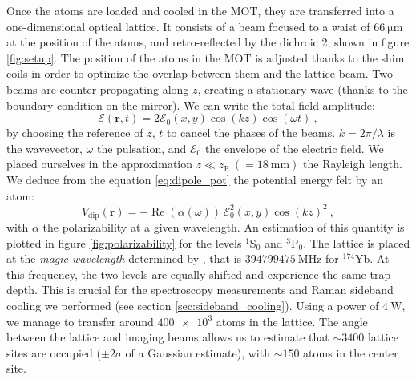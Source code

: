 \documentclass[11pt]{article}
\newcommand{\mathsc}[1]{\mathrm{\scriptscriptstyle {#1}}}
\numberwithin{equation}{section}
\numberwithin{figure}{section}
\begin{document}
Once the atoms are loaded and cooled in the MOT, they are transferred into a one-dimensional optical lattice. It consists of a beam focused to a waist of $\SI{66}{\micro\metre}$ at the position of the atoms, and retro-reflected by the dichroic 2, shown in figure \ref{fig:setup}. The position of the atoms in the MOT is adjusted thanks to the shim coils in order to optimize the overlap between them and the lattice beam. 
Two beams are counter-propagating along $z$, creating a stationary wave (thanks to the boundary condition on the mirror). We can write the total field amplitude:
%
\begin{equation}
	\mathcal{E}(\mathbf{r}, t) = 2 \mathcal{E}_0(x, y) \cos(kz) \cos(\omega t)~,
\end{equation}
%
by choosing the reference of $z$, $t$ to cancel the phases of the beams. $k = 2 \pi / \lambda$ is the wavevector, $\omega$ the pulsation, and $\mathcal{E}_0$ the envelope of the electric field. We placed ourselves in the approximation $z \ll z_\mathsc{R} \,(= \SI{18}{\milli\metre})$ the Rayleigh length. We deduce from the equation \eqref{eq:dipole_pot} the potential energy felt by an atom:
%
\begin{equation}
	\label{eq:lattice_potential}
	V_\text{dip}(\mathbf{r}) = - \operatorname{Re}(\alpha(\omega))\, \mathcal{E}_0^2 (x,y) \cos(kz)^2~,
\end{equation}
%
with $\alpha$ the polarizability at a given wavelength. An estimation of this quantity is plotted in figure \ref{fig:polarizability} for the levels $^1$S$_0$ and $^3$P$_0$. The lattice is placed at the \emph{magic wavelength} determined by \cite{2008_barber}, that is $\SI{394799475}{\mega\hertz}$ for $^{174}$Yb. At this frequency, the two levels are equally shifted and experience the same trap depth. This is crucial for the spectroscopy measurements and Raman sideband cooling we performed (see section \ref{sec:sideband_cooling}). Using a power of $\SI{4}{\watt}$, we manage to transfer around $\num{400e3}$ atoms in the lattice. The angle between the lattice and imaging beams allows us to estimate that $\sim 3400$ lattice sites are occupied ($\pm 2 \sigma$ of a Gaussian estimate), with $\sim 150$ atoms in the center site.\\
\end{document}
